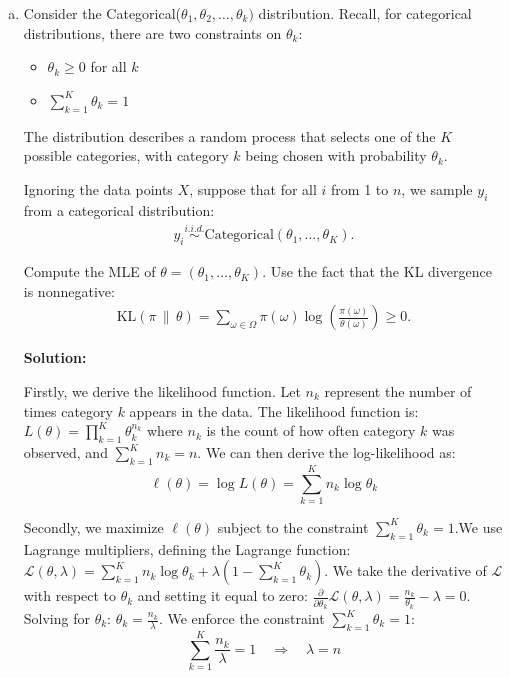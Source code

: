 \documentclass{article}
\newenvironment{solution}{\color{blue} \smallskip \textbf{Solution:}}{}
\begin{document}
\begin{enumerate}[(a)]
\begin{solution}
    \end{solution}

    \newpage
    \item %
    Consider the Categorical($\theta_{1}, \theta_{2}, \ldots, \theta_{k})$ distribution. Recall, for categorical distributions, there are two constraints on $\theta_{k}$:
    \begin{itemize}
        \item $\theta_{k} \geq 0$ for all $k$
        \item $\sum_{k = 1}^{K} \theta_{k} = 1$
    \end{itemize}
    The distribution describes a random process that selects one of the $K$ possible categories, with category $k$ being chosen with probability $\theta_{k}$.

    Ignoring the data points $X$, suppose that for all $i$ from 1 to $n$, we sample $y_{i}$ from a categorical distribution:
    \begin{align*}
        y_i \stackrel{i.i.d.}{\sim} \mathrm{Categorical}(\theta_1,\ldots, \theta_K).
    \end{align*}

    Compute the MLE of $\theta = (\theta_1,\ldots, \theta_K)$. Use the fact that the KL divergence is nonnegative: 
    \begin{align*}
        \mathrm{KL}(\pi\,\|\, \theta) = \sum_{\omega\in\Omega} \pi(\omega)\log\left(\frac{\pi(\omega)}{\theta(\omega)}\right)\geq 0.
    \end{align*}

    \begin{solution}
 
Firstly, we derive the likelihood function. Let \( n_k \) represent the number of times category \( k \) appears in the data. The likelihood function is:
\(
L(\theta) = \prod_{k=1}^{K} \theta_k^{n_k}
\)
where \( n_k \) is the count of how often category \( k \) was observed, and \( \sum_{k=1}^{K} n_k = n \). We can then derive the log-likelihood as:
\[
\ell(\theta) = \log L(\theta) = \sum_{k=1}^{K} n_k \log \theta_k
\]

Secondly, we maximize \( \ell(\theta) \) subject to the constraint \( \sum_{k=1}^{K} \theta_k = 1 \).We use Lagrange multipliers, defining the Lagrange function:
\(
\mathcal{L}(\theta, \lambda) = \sum_{k=1}^{K} n_k \log \theta_k + \lambda \left( 1 - \sum_{k=1}^{K} \theta_k \right)
\). We take the derivative of \( \mathcal{L} \) with respect to \( \theta_k \) and setting it equal to zero:
\(
\frac{\partial}{\partial \theta_k} \mathcal{L}(\theta, \lambda) = \frac{n_k}{\theta_k} - \lambda = 0
\). Solving for \( \theta_k \):
\(
\theta_k = \frac{n_k}{\lambda}
\). We enforce the constraint \( \sum_{k=1}^{K} \theta_k = 1 \):
\[
\sum_{k=1}^{K} \frac{n_k}{\lambda} = 1 \quad \Rightarrow \quad \lambda = n
\]


\end{solution}
\end{enumerate}
\end{document}
